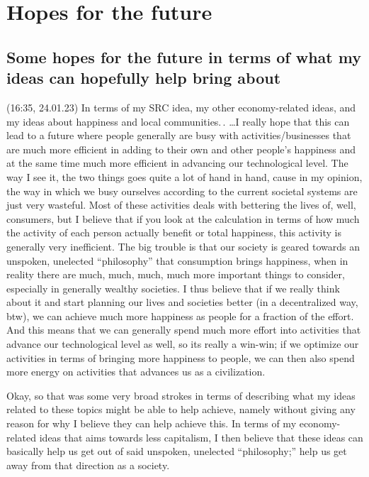 \documentclass{report}
\begin{document}
\chapter{Hopes for the future}

\section{Some hopes for the future in terms of what my ideas can hopefully help bring about}
\label{Some_hopes_in_terms_of_my_ideas}

(16:35, 24.01.23) In terms of my SRC idea, my other economy-related ideas, and my ideas about happiness and local communities.\,. %
\ldots I really hope that this can lead to a future where people generally are busy with activities/businesses that are much more efficient in adding to their own and other people's happiness and at the same time much more efficient in advancing our technological level. The way I see it, the two things goes quite a lot of hand in hand, cause in my opinion, the way in which we busy ourselves according to the current societal systems are just very wasteful. Most of these activities deals with bettering the lives of, well, consumers, but I believe that if you look at the calculation in terms of how much the activity of each person actually benefit or total happiness, this activity is generally very inefficient. The big trouble is that our society is geared towards an unspoken, unelected ``philosophy'' that consumption brings happiness, when in reality there are much, much, much, much more important things to consider, especially in generally wealthy societies. I thus believe that if we really think about it and start planning our lives and societies better (in a decentralized way, btw), we can achieve much more happiness as people for a fraction of the effort. And this means that we can generally spend much more effort into activities that advance our technological level as well, so its really a win-win; if we optimize our activities in terms of bringing more happiness to people, we can then also spend more energy on activities that advances us as a civilization.

Okay, so that was some very broad strokes in terms of describing what my ideas related to these topics might be able to help achieve, namely without giving any reason for why I believe they can help achieve this. In terms of my economy-related ideas that aims towards less capitalism, I then believe that these ideas can basically help us get out of said unspoken, unelected ``philosophy;'' help us get away from that direction as a society. 
\end{document}
